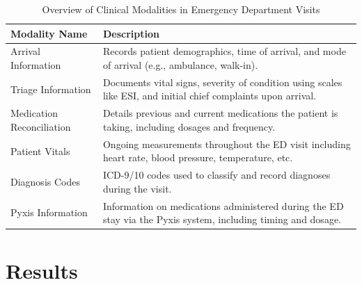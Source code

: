 \documentclass{article}
\theoremstyle{plain}
\theoremstyle{definition}
\theoremstyle{remark}
\begin{document}
\begin{table}[h!]
\caption{Overview of Clinical Modalities in Emergency Department Visits}
\label{clinical-modalities-table}
\begin{center}
\begin{small}
\begin{tabularx}{5in}{lX} %
\toprule
Modality Name & Description \\
\midrule
Arrival Information & Records patient demographics, time of arrival, and mode of arrival (e.g., ambulance, walk-in). \\
Triage Information & Documents vital signs, severity of condition using scales like ESI, and initial chief complaints upon arrival. \\
Medication Reconciliation & Details previous and current medications the patient is taking, including dosages and frequency. \\
Patient Vitals & Ongoing measurements throughout the ED visit including heart rate, blood pressure, temperature, etc. \\
Diagnosis Codes & ICD-9/10 codes used to classify and record diagnoses during the visit. \\
Pyxis Information & Information on medications administered during the ED stay via the Pyxis system, including timing and dosage. \\
\bottomrule
\end{tabularx}
\end{small}
\end{center}
\end{table}

\newpage

\section{Results}
\end{document}
